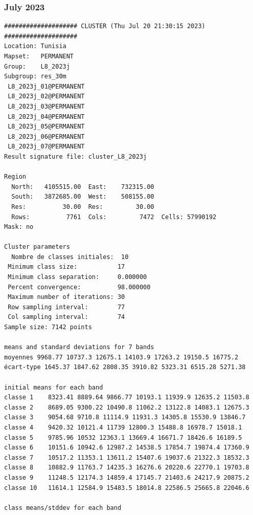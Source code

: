 \documentclass[land,article,submit,pdftex,moreauthors]{Definitions/mdpi}
\begin{document}
\subsubsection[\appendixname~\thesubsubsection]{July 2023}
\begin{scriptsize}
\begin{verbatim}
#################### CLUSTER (Thu Jul 20 21:30:15 2023) ####################
Location: Tunisia
Mapset:   PERMANENT
Group:    L8_2023j
Subgroup: res_30m
 L8_2023j_01@PERMANENT
 L8_2023j_02@PERMANENT
 L8_2023j_03@PERMANENT
 L8_2023j_04@PERMANENT
 L8_2023j_05@PERMANENT
 L8_2023j_06@PERMANENT
 L8_2023j_07@PERMANENT
Result signature file: cluster_L8_2023j

Region
  North:   4105515.00  East:    732315.00
  South:   3872685.00  West:    508155.00
  Res:          30.00  Res:         30.00
  Rows:          7761  Cols:         7472  Cells: 57990192
Mask: no

Cluster parameters
  Nombre de classes initiales: 	10
 Minimum class size:           17
 Minimum class separation:     0.000000
 Percent convergence:          98.000000
 Maximum number of iterations: 30
 Row sampling interval:        77
 Col sampling interval:        74
Sample size: 7142 points

means and standard deviations for 7 bands
moyennes 9968.77 10737.3 12675.1 14103.9 17263.2 19150.5 16775.2
écart-type 1645.37 1847.62 2808.35 3910.82 5323.31 6515.28 5271.38

initial means for each band
classe 1    8323.41 8889.64 9866.77 10193.1 11939.9 12635.2 11503.8
classe 2    8689.05 9300.22 10490.8 11062.2 13122.8 14083.1 12675.3
classe 3    9054.68 9710.8 11114.9 11931.3 14305.8 15530.9 13846.7
classe 4    9420.32 10121.4 11739 12800.3 15488.8 16978.7 15018.1
classe 5    9785.96 10532 12363.1 13669.4 16671.7 18426.6 16189.5
classe 6    10151.6 10942.6 12987.2 14538.5 17854.7 19874.4 17360.9
classe 7    10517.2 11353.1 13611.2 15407.6 19037.6 21322.3 18532.3
classe 8    10882.9 11763.7 14235.3 16276.6 20220.6 22770.1 19703.8
classe 9    11248.5 12174.3 14859.4 17145.7 21403.6 24217.9 20875.2
classe 10   11614.1 12584.9 15483.5 18014.8 22586.5 25665.8 22046.6

class means/stddev for each band


\end{verbatim}
\end{scriptsize}
\end{document}
